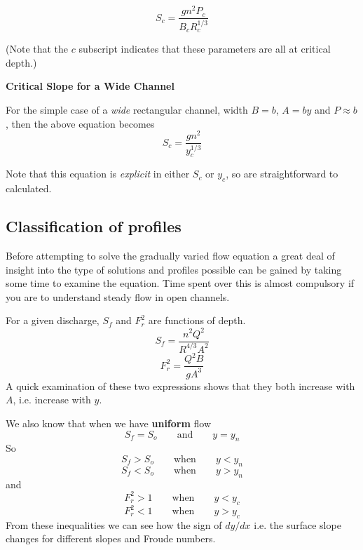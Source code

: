 \documentclass[a4paper, 12pt, british]{article} %
\numberwithin{equation}{section}
\numberwithin{figure}{section}
\numberwithin{table}{section}
\begin{document}
\begin{equation}
S_c = \frac{gn^2P_c}{B_c R_c^{1/3}}
\label{eq:sc}
\end{equation} 

(Note that the $c$ subscript indicates that these parameters are all at critical depth.)

\textbf{Critical Slope for a Wide Channel}

For the simple case of a \textit{wide} rectangular channel, width $B = b$, $A = by$ and $P\approx b$, then the above equation becomes
\begin{equation}
S_c = \frac{gn^2}{y_c^{1/3}}
\label{eq:sc_wide} %
\end{equation}

Note that this equation is \textit{explicit} in either $S_c$ or $y_c$, so are straightforward to calculated.


\subsection{Classification of profiles}

Before attempting to solve the gradually varied flow equation a great deal of insight into the type of solutions and profiles possible can be gained by taking some time to examine the equation. Time spent over this is almost compulsory if you are to understand steady flow in open channels.

For a given discharge, $S_f$ and $F_r^2$ are functions of depth. 
\begin{equation}
S_f = \frac{n^2 Q^2}{R^{4/3}A^2} 
\label{eq:sf1} 
\end{equation} 
\begin{equation}
F_r^2 = \frac{Q^2 B}{gA^3} 
\label{eq:fr3} 
\end{equation} 
A quick examination of these two expressions shows that they both increase with $A$, i.e. increase with $y$.

We also know that when we have \textbf{uniform} flow
\begin{equation*}
S_f =  S_o	\qquad	\text{and} \qquad 	y = y_n
\end{equation*}
 So
\begin{equation*}
 S_f > S_o	\qquad	\text{when} \qquad 	y < y_n
\end{equation*}		
\begin{equation*}
S_f < S_o	\qquad	\text{when} \qquad 	y > y_n
\end{equation*}
and
\begin{equation*}
F_r^2 > 1	\qquad	\text{when} \qquad 	y < y_c
\end{equation*}
\begin{equation*}
F_r^2 < 1	\qquad	\text{when} \qquad 	y > y_c
\end{equation*}
From these inequalities we can see how the sign of $dy/dx$ i.e. the surface slope changes for different slopes and Froude numbers.
\end{document}
